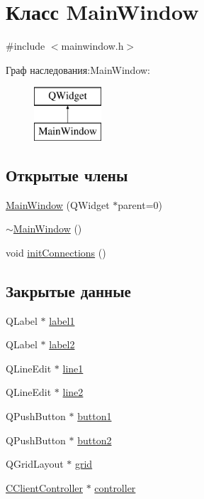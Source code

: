 \hypertarget{class_main_window}{}\section{Класс Main\+Window}
\label{class_main_window}


{\ttfamily \#include $<$mainwindow.\+h$>$}

Граф наследования\+:Main\+Window\+:\begin{figure}[H]
\begin{center}
\leavevmode
\includegraphics[height=2.000000cm]{class_main_window}
\end{center}
\end{figure}
\subsection*{Открытые члены}
\begin{DoxyCompactItemize}
\item 
\hyperlink{class_main_window_a8b244be8b7b7db1b08de2a2acb9409db}{Main\+Window} (Q\+Widget $\ast$parent=0)
\item 
\hyperlink{class_main_window_ae98d00a93bc118200eeef9f9bba1dba7}{$\sim$\+Main\+Window} ()
\item 
void \hyperlink{class_main_window_aecba599b372d9fdf89dfbc1f4a060019}{init\+Connections} ()
\end{DoxyCompactItemize}
\subsection*{Закрытые данные}
\begin{DoxyCompactItemize}
\item 
Q\+Label $\ast$ \hyperlink{class_main_window_a95477871d987adcaef8cfea7b87e27b0}{label1}
\item 
Q\+Label $\ast$ \hyperlink{class_main_window_ae83149c8748d57de45e882c51baef867}{label2}
\item 
Q\+Line\+Edit $\ast$ \hyperlink{class_main_window_af08619c735ace803854d9f3fc6fdf4d2}{line1}
\item 
Q\+Line\+Edit $\ast$ \hyperlink{class_main_window_a6bfac503123591b8bb31fd8e7dddd0c3}{line2}
\item 
Q\+Push\+Button $\ast$ \hyperlink{class_main_window_a96ee7d6a31dd131de9220930822f9da7}{button1}
\item 
Q\+Push\+Button $\ast$ \hyperlink{class_main_window_ad24e1c4eebdd74c9aadeea1f4c98414f}{button2}
\item 
Q\+Grid\+Layout $\ast$ \hyperlink{class_main_window_a152a77e5d13ba05ca3deb8cec9ab0365}{grid}
\item 
\hyperlink{class_c_client_controller}{C\+Client\+Controller} $\ast$ \hyperlink{class_main_window_af1f864005894311612c0b9174f82db8a}{controller}
\end{DoxyCompactItemize}


